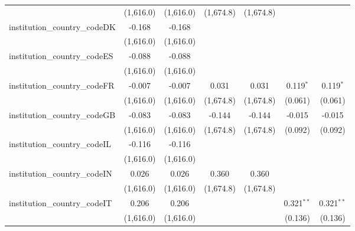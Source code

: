 \begin{tabular}{lcccccc}
                                         & (1,616.0)      & (1,616.0)      & (1,674.8)     & (1,674.8)     &              &   \\   
   institution\_country\_codeDK          & -0.168         & -0.168         &               &               &              &   \\   
                                         & (1,616.0)      & (1,616.0)      &               &               &              &   \\   
   institution\_country\_codeES          & -0.088         & -0.088         &               &               &              &   \\   
                                         & (1,616.0)      & (1,616.0)      &               &               &              &   \\   
   institution\_country\_codeFR          & -0.007         & -0.007         & 0.031         & 0.031         & 0.119$^{*}$  & 0.119$^{*}$\\   
                                         & (1,616.0)      & (1,616.0)      & (1,674.8)     & (1,674.8)     & (0.061)      & (0.061)\\   
   institution\_country\_codeGB          & -0.083         & -0.083         & -0.144        & -0.144        & -0.015       & -0.015\\   
                                         & (1,616.0)      & (1,616.0)      & (1,674.8)     & (1,674.8)     & (0.092)      & (0.092)\\   
   institution\_country\_codeIL          & -0.116         & -0.116         &               &               &              &   \\   
                                         & (1,616.0)      & (1,616.0)      &               &               &              &   \\   
   institution\_country\_codeIN          & 0.026          & 0.026          & 0.360         & 0.360         &              &   \\   
                                         & (1,616.0)      & (1,616.0)      & (1,674.8)     & (1,674.8)     &              &   \\   
   institution\_country\_codeIT          & 0.206          & 0.206          &               &               & 0.321$^{**}$ & 0.321$^{**}$\\   
                                         & (1,616.0)      & (1,616.0)      &               &               & (0.136)      & (0.136)\\   

\end{tabular}
